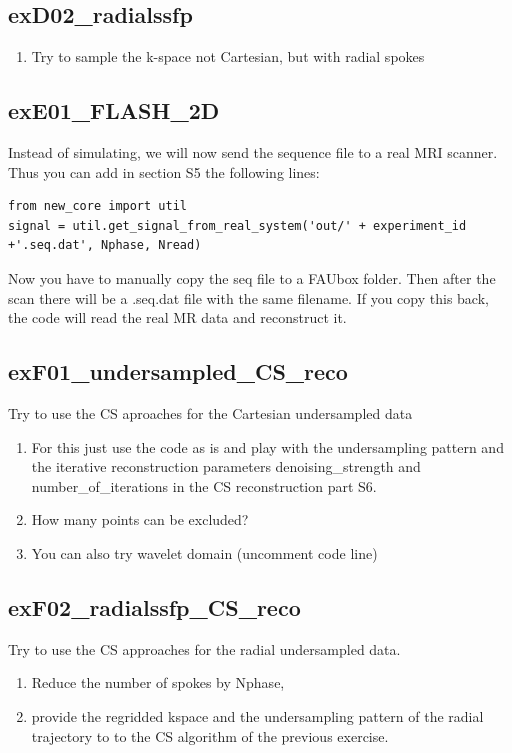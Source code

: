 \documentclass[a4paper,12pt]{extarticle}
\begin{document}
\subsection{exD02\_radialssfp}
\begin{enumerate}
\item Try to sample the k-space not Cartesian, but with radial spokes
\end{enumerate}

\subsection{exE01\_FLASH\_2D}
Instead of simulating, we will now send the sequence file to a real MRI scanner.
Thus you can add in section S5 the following lines:
\begin{verbatim}
from new_core import util
signal = util.get_signal_from_real_system('out/' + experiment_id +'.seq.dat', Nphase, Nread)
\end{verbatim}

Now you have to manually copy the seq file to a FAUbox folder. Then after the scan there will be a .seq.dat file with the same filename. If you copy this back, the code will read the real MR data and reconstruct it. 

\subsection{exF01\_undersampled\_CS\_reco}
Try to use the CS aproaches for the Cartesian undersampled data
\begin{enumerate}
\item For this just use the code as is and play with the undersampling pattern and the iterative reconstruction parameters denoising\_strength and number\_of\_iterations in the CS reconstruction part S6.
\item How many points can be excluded?
\item You can also try wavelet domain (uncomment code line)
\end{enumerate}
        
\subsection{exF02\_radialssfp\_CS\_reco}       
Try to use the CS approaches for the radial undersampled data.

\begin{enumerate}
\item Reduce the number of spokes by Nphase, 
\item provide the regridded kspace and the undersampling pattern of the radial trajectory to to the CS algorithm of the previous exercise.
\end{enumerate}
\end{document}
